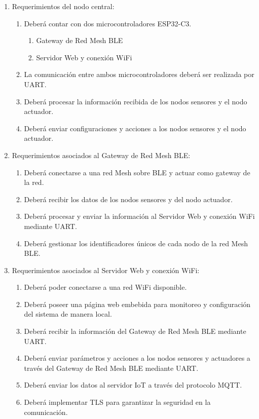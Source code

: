 \documentclass[
11pt, %
codirector, %
]{charter}
\begin{document}
\begin{enumerate}
	\item Requerimientos del nodo central:
	      \begin{enumerate}
		      \item Deberá contar con dos microcontroladores ESP32-C3.
		            \begin{enumerate}
			            \item Gateway de Red Mesh BLE
			            \item Servidor Web y conexión WiFi
		            \end{enumerate}
		      \item La comunicación entre ambos microcontroladores deberá ser realizada por UART.
		      \item Deberá procesar la información recibida de los nodos sensores y el nodo
		            actuador.
		      \item Deberá enviar configuraciones y acciones a los nodos sensores y el nodo
		            actuador.
	      \end{enumerate}

	      \pagebreak

	\item Requerimientos asociados al Gateway de Red Mesh BLE:
	      \begin{enumerate}
		      \item Deberá conectarse a una red Mesh sobre BLE y actuar como gateway de la red.
		      \item Deberá recibir los datos de los nodos sensores y del nodo actuador.
		      \item Deberá procesar y enviar la información al Servidor Web y conexión WiFi
		            mediante UART.
		      \item Deberá gestionar los identificadores únicos de cada nodo de la red Mesh BLE.
	      \end{enumerate}

	\item Requerimientos asociados al Servidor Web y conexión WiFi:
	      \begin{enumerate}
		      \item Deberá poder conectarse a una red WiFi disponible.
		      \item Deberá poseer una página web embebida para monitoreo y configuración del
		            sistema de manera local.
		      \item Deberá recibir la información del Gateway de Red Mesh BLE mediante UART.
		      \item Deberá enviar parámetros y acciones a los nodos sensores y actuadores a través
		            del Gateway de Red Mesh BLE mediante UART.
		      \item Deberá enviar los datos al servidor IoT a través del protocolo MQTT.
		      \item Deberá implementar TLS para garantizar la seguridad en la comunicación.
	      \end{enumerate}


\end{enumerate}
\end{document}
